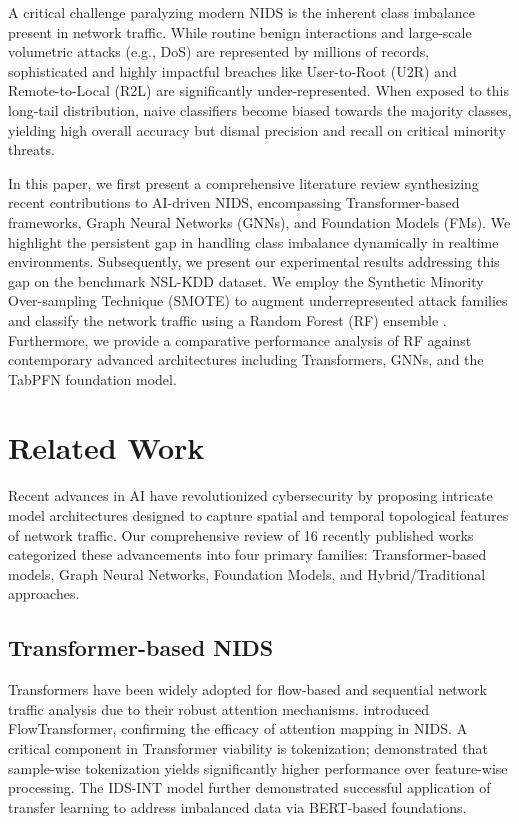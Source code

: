 \documentclass[sn-basic,oneside]{sn-jnl}
\theoremstyle{thmstyleone}%
\theoremstyle{thmstyletwo}%
\theoremstyle{thmstylethree}%
\begin{document}
A critical challenge paralyzing modern NIDS is the inherent class imbalance present in network traffic. While routine benign interactions and large-scale volumetric attacks (e.g., DoS) are represented by millions of records, sophisticated and highly impactful breaches like User-to-Root (U2R) and Remote-to-Local (R2L) are significantly under-represented. When exposed to this long-tail distribution, naive classifiers become biased towards the majority classes, yielding high overall accuracy but dismal precision and recall on critical minority threats. 

In this paper, we first present a comprehensive literature review synthesizing recent contributions to AI-driven NIDS, encompassing Transformer-based frameworks, Graph Neural Networks (GNNs), and Foundation Models (FMs). We highlight the persistent gap in handling class imbalance dynamically in realtime environments. Subsequently, we present our experimental results addressing this gap on the benchmark NSL-KDD dataset. We employ the Synthetic Minority Over-sampling Technique (SMOTE) \citep{chawla2002smote} to augment underrepresented attack families and classify the network traffic using a Random Forest (RF) ensemble \citep{breiman2001random}. Furthermore, we provide a comparative performance analysis of RF against contemporary advanced architectures including Transformers, GNNs, and the TabPFN foundation model.

\section{Related Work}\label{sec2}

Recent advances in AI have revolutionized cybersecurity by proposing intricate model architectures designed to capture spatial and temporal topological features of network traffic. Our comprehensive review of 16 recently published works categorized these advancements into four primary families: Transformer-based models, Graph Neural Networks, Foundation Models, and Hybrid/Traditional approaches.

\subsection{Transformer-based NIDS}
Transformers have been widely adopted for flow-based and sequential network traffic analysis due to their robust attention mechanisms. \citet{manocchio2024flowtransformer} introduced FlowTransformer, confirming the efficacy of attention mapping in NIDS. A critical component in Transformer viability is tokenization; \citet{aksholak2026transformer} demonstrated that sample-wise tokenization yields significantly higher performance over feature-wise processing. The IDS-INT model \citep{ullah2024ids} further demonstrated successful application of transfer learning to address imbalanced data via BERT-based foundations.
\end{document}
